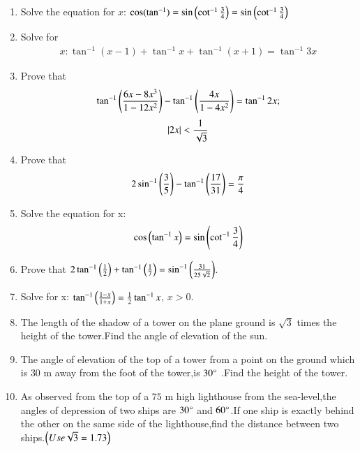 \begin{enumerate}
	\hfill{}\item Solve the equation for $x$: $\cos (\tan^{-1}) = \sin \left(\cot^{-1} \frac{3}{4}\right) = \sin \left(\cot^{-1} \frac{3}{4}\right)$

	
	\hfill{}\item Solve for 
	\begin{align*}
		x: \tan^{-1}(x-1) + \tan^{-1}x + \tan^{-1}(x+1) = \tan^{-1}3x
	\end{align*}

	\hfill{}\item Prove that 
	\begin{align*}
	\tan^{-1} \left(\frac{6x-8x^{3}}{1-12x^{2}}\right) - \tan^{-1} \left(\frac{4x}{1-4x^{2}}\right) = \tan^{-1}2x;
	\end{align*}
	\begin{align*}
		\left\vert2x\right\vert < \frac{1}{\sqrt{3}}
	\end{align*}

 	\hfill{}\item Prove that 
	\begin{align*}
		2\sin^{-1}\left(\frac{3}{5}\right)-\tan^{-1}\left(\frac{17}{31}\right) = \frac{\pi}{4}
	\end{align*}
	\hfill{}\item Solve the equation for x:
	\begin{align*}
	\cos\left(\tan^{-1}x\right) = \sin\left(\cot^{-1}\frac{3}{4}\right)
	\end{align*}
\hfill{}
\item Prove that $2\tan^{-1}\left(\frac{1}{2}\right)+\tan^{-1}\left(\frac{1}{7}\right) = \sin^{-1}\left(\frac{31}{25\sqrt{2}}\right)$. 

\hfill{}\item Solve for x: $\tan^{-1}\left(\frac{1-x}{1+x}\right) = \frac{1}{2}\tan^{-1}x$, $x>0$. 
\hfill{}
\item The length of the shadow of a tower on the plane ground is $\sqrt{3}$ times the height of the tower.Find the angle of elevation of the sun.

\hfill{}\item  The angle of elevation of the top of a tower from a point on the ground which is $30$ m away from the foot of the tower,is $30\degree$ .Find the height of the tower.

\hfill{}\item  As observed from the top of a $75$ m high lighthouse from the sea-level,the angles of depression of two ships are $30\degree$ and $60\degree$.If one ship is exactly behind the other on the same side of the lighthouse,find the distance between two ships.$\left(Use \sqrt{3} = 1.73\right)$


\end{enumerate}
